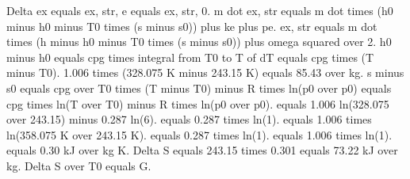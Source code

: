 Delta ex equals ex, str, e equals ex, str, 0.
m dot ex, str equals m dot times (h0 minus h0 minus T0 times (s minus s0)) plus ke plus pe.
ex, str equals m dot times (h minus h0 minus T0 times (s minus s0)) plus omega squared over 2.
h0 minus h0 equals cpg times integral from T0 to T of dT equals cpg times (T minus T0).
1.006 times (328.075 K minus 243.15 K) equals 85.43 over kg.
s minus s0 equals cpg over T0 times (T minus T0) minus R times ln(p0 over p0) equals cpg times ln(T over T0) minus R times ln(p0 over p0).
equals 1.006 ln(328.075 over 243.15) minus 0.287 ln(6).
equals 0.287 times ln(1).
equals 1.006 times ln(358.075 K over 243.15 K).
equals 0.287 times ln(1).
equals 1.006 times ln(1).
equals 0.30 kJ over kg K.
Delta S equals 243.15 times 0.301 equals 73.22 kJ over kg.
Delta S over T0 equals G.